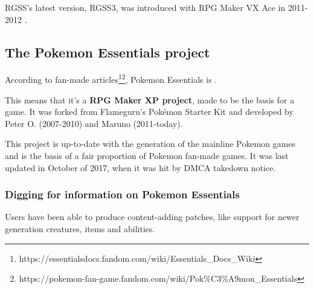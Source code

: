 \documentclass[11pt]{article}
\begin{document}

RGSS's latest version, RGSS3, was introduced with RPG Maker VX Ace in 2011-2012 \cite{rgssspec,rmvxacerelease}.






\subsection{The Pokemon Essentials project}


According to fan-made articles\footnote{https://essentialsdocs.fandom.com/wiki/Essentials\_Docs\_Wiki}\footnote{https://pokemon-fan-game.fandom.com/wiki/Pok\%C3\%A9mon\_Essentials}, Pokemon Essentials is .

This means that it's a \textbf{RPG Maker XP project}, made to be the basis for a game. It was forked from Flameguru's Pokémon Starter Kit and developed by Peter O. (2007-2010) and Maruno (2011-today).

This project is up-to-date with the  generation of the mainline Pokemon games and is the basis of a fair proportion of Pokemon fan-made games. It was last updated in October of 2017, when it was hit by DMCA takedown notice.

\newpage
\subsubsection{Digging for information on Pokemon Essentials}

Users have been able to produce content-adding patches, like support for newer generation creatures, items and abilities.
\end{document}
